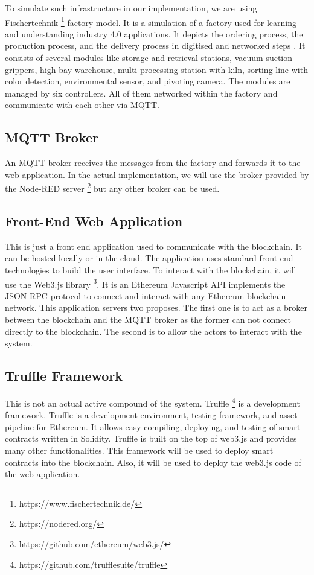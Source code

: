 \documentclass[runningheads]{llncs}
\begin{document}
\bigbreak

\noindent To simulate such infrastructure in our implementation, we are using Fischertechnik \footnote{https://www.fischertechnik.de/} factory model. It is a simulation of a factory used for learning and understanding industry 4.0 applications. It depicts the ordering process, the production process, and the delivery process in digitised and networked steps \cite{Industry}. It consists of several modules like storage and retrieval stations, vacuum suction grippers, high-bay warehouse, multi-processing station with kiln, sorting line with color detection, environmental sensor, and pivoting camera. The modules are managed by six controllers. All of them networked within the factory and communicate with each other via MQTT.

\subsection{MQTT Broker}
An MQTT broker receives the messages from the factory and forwards it to the web application. In the actual implementation, we will use the broker provided by the Node-RED server \footnote{https://nodered.org/} but any other broker can be used.

\subsection{Front-End Web Application}
This is just a front end application used to communicate with the blockchain. It can be hosted locally or in the cloud. The application uses standard front end technologies to build the user interface. To interact with the blockchain, it will use the Web3.js library \footnote{https://github.com/ethereum/web3.js/}. It is an Ethereum Javascript API implements the JSON-RPC protocol to connect and interact with any Ethereum blockchain network. This application servers two proposes. The first one is to act as a broker between the blockchain and the MQTT broker as the former can not connect directly to the blockchain. The second is to allow the actors to interact with the system. 


\subsection{Truffle Framework}
This is not an actual active compound of the system. Truffle \footnote{https://github.com/trufflesuite/truffle} is a development framework. Truffle is a development environment, testing framework, and asset pipeline for Ethereum. It allows easy compiling, deploying, and testing of smart contracts written in Solidity. Truffle is built on the top of web3.js and provides many other functionalities. This framework will be used to deploy smart contracts into the blockchain. Also, it will be used to deploy the web3.js code of the web application. 
\end{document}
